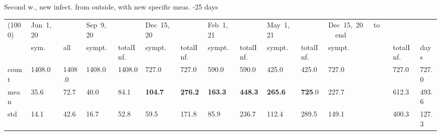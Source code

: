 \documentclass[8pt]{beamer}
\begin{document}
\begin{frame}{Second w., new infect. from outside, with new specific meas. -25 days}
\begin{table}[H]
\center
\tiny
\begin{tabular}{p{0.3cm}p{0.3cm}p{0.3cm}p{0.3cm}p{0.3cm}p{0.3cm}p{0.3cm}p{0.3cm}p{0.3cm}p{0.3cm}p{0.3cm}p{0.3cm}p{0.3cm}p{0.4cm}}
\toprule
(1000) &  Jun~1,~20 & &  Sep~9,~20 & & Dec~15,~20 & & Feb~1,~21 & & May~1,~21 & & Dec~15,~20~~~to~~~end   \\
{} &  sym. &  all &  sympt. &  totalInf. &  sympt. &  totalInf. &  sympt. &  totalInf. &  sympt. &  totalInf. &  sympt. &  totalInf.  & days\\
\midrule
count &   1408.0 &                     1408.0 &   1408.0 &                     1408.0 &    727.0 &                      727.0 &    590.0 &                      590.0 &    425.0 &                      425.0 &              727.0 &                   727.0 &  727.0 \\
mean  &     35.6 &                       72.7 &     40.0 &                       84.1 &    \textbf{{\color{orange}104.7}} &                      \textbf{{\color{orange}276.2}} &    \textbf{163.3} &                      \textbf{448.3} &    \textbf{265.6} &                     \textbf{725}.0 &               227.7 &                   612.3 &  493.6 \\
std   &     14.1 &                       42.6 &     16.7 &                       52.8 &     59.5 &                      171.8 &     85.9 &                      236.7 &    112.4 &                      289.5 &               149.1 &                   400.3 &  127.3 \\
\bottomrule
\end{tabular}

\label{selForceWave2Contr2M-25Tab}
\end{table}


\end{frame}
\end{document}
